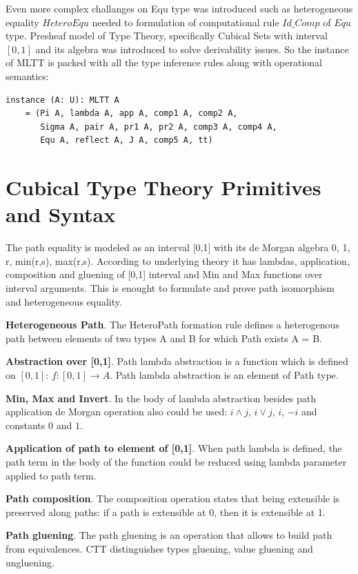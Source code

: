 \documentclass{svproc}
\begin{document}
Even more complex challanges on Equ type was introduced such
as heterogeneous equality $HeteroEqu$ needed to formulation
of computational rule $Id\_Comp$ of $Equ$ type. Presheaf model of Type Theory, specifically
Cubical Sets with interval $[0,1]$ and
its algebra was introduced to solve derivability issues. So the instance of MLTT is packed
with all the type inference rules along with operational semantics:

\begin{lstlisting}[mathescape=true]
instance (A: U): MLTT A
    = (Pi A, lambda A, app A, comp1 A, comp2 A,
       Sigma A, pair A, pr1 A, pr2 A, comp3 A, comp4 A,
       Equ A, reflect A, J A, comp5 A, tt)
\end{lstlisting}

\section{Cubical Type Theory Primitives and Syntax}

The path equality is modeled as an interval [0,1] with
its de Morgan algebra 0, 1, r, min(r,s), max(r,s). According to underlying theory
it has lambdas, application, composition and gluening of [0,1] interval and Min and Max
functions over interval arguments. This is enought to formulate and prove path
isomorphism and heterogeneous equality.

{\bf Heterogeneous Path}. The HeteroPath formation rule defines a heterogenous path
between elements of two types A and B for which Path exists A = B.

{\bf Abstraction over [0,1]}. Path lambda abstraction is a function which is defined on $[0,1]$:
$f: [0,1] \rightarrow A$. Path lambda abstraction is an element of Path type.

{\bf Min, Max and Invert}. In the body of lambda abstraction besides path application
de Morgan operation also could be used: $i \wedge j$, $i \vee j$, $i$, $-i$ and constants $0$ and $1$.

{\bf Application of path to element of [0,1]}. When path lambda is defined, the path term
in the body of the function could be reduced using lambda parameter applied to path term.

{\bf Path composition}. The composition operation states that being extensible
is preserved along paths: if a path is extensible at 0, then it is extensible at 1.

{\bf Path gluening}. The path gluening is an operation that allows to build
path from equivalences. CTT distinguishes types gluening, value gluening and ungluening.
\end{document}

